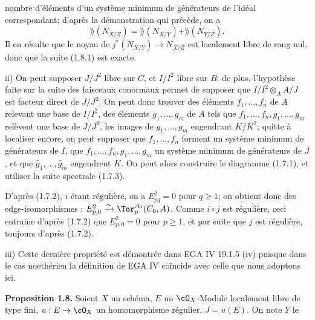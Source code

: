 nombre d'éléments d'un système minimum de générateurs de l'idéal correspondant; d'après la démonstration qui précède, on a
\[
 \rang(N_{X/Z})=\rang(N_{X/Y})+\rang(N_{Y/Z}).
\]
Il en résulte que le noyau de $j^*(N_{X/Y})\longrightarrow N_{X/Z}$ est localement libre de rang nul, donc que la suite (1.8.1) est exacte.

ii) On peut supposer $J/J^2$ libre sur $C$, et $I/I^2$ libre sur $B$; de plus, l'hypothèse faite sur la suite des faisceaux conormaux permet de supposer que $I/I^2\otimes_A A/J$ est facteur direct de $J/J^2$. On peut donc trouver des éléments $f_1,\ldots,f_n$ de $A$ relevant une base de $I/I^2$, des éléments $g_1,\ldots,g_m$ de $A$ tels que $f_1,\ldots,f_n,g_1,\ldots,g_m$ relèvent une base de $J/J^2$, les images de $g_1,\ldots,g_m$ engendrant $K/K^2$; quitte à localiser encore, on peut supposer que $f_1,\ldots,f_n$ forment un système minimum de générateurs de $I$, que $f_1,\ldots,f_n,g_1,\ldots,g_m$ un système minimum de générateurs de $J$, et que $\bar g_1,\ldots,\bar g_m$ engendrent $K$. On peut alors construire le diagramme (1.7.1), et utiliser la suite spectrale (1.7.3).

D'après (1.7.2), $i$ étant régulière, on a $E^2_{pq}=0$ pour $q\geq1$; on obtient donc des edge-isomorphismes : $E^2_{p,0}\xrightarrow{\sim}\Tor_p^{A_0}(C_0,A)$. Comme $i\circ j$ est régulière, ceci entraine d'après (1.7.2) que $E^2_{p,0}=0$ pour $p\geq1$, et par suite que $j$ est régulière, toujours d'après (1.7.2).

iii) Cette dernière propriété est démontrée dans EGA IV 19.1.5 (iv) puisque dans le cas noethérien la définition de EGA IV coïncide avec celle que nous adoptons ici.

\textbf{Proposition 1.8.} Soient \(X\) un schéma, \(E\) un \(\cO_X\)-Module localement libre de type fini, \(u:E\to\cO_X\) un homomorphisme régulier, \(J=u(E)\). On note \(Y\) le
